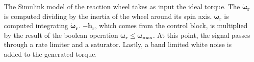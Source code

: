 The Simulink model of the reaction wheel takes as input the ideal torque. The $\boldsymbol{\dot{\omega}_r}$ is computed dividing by the inertia of the wheel around its spin axis. $\boldsymbol{\omega_r}$ is computed integrating $\boldsymbol{\dot{\omega}_r}$. $-\boldsymbol{\dot{h}_r}$, which comes from the control block, is multiplied by the result of the boolean operation $\boldsymbol{\omega_r}\le\boldsymbol{\omega_{max}}$. At this point, the signal passes through a rate limiter and  a saturator. Lastly, a band limited white noise is added to the generated torque.